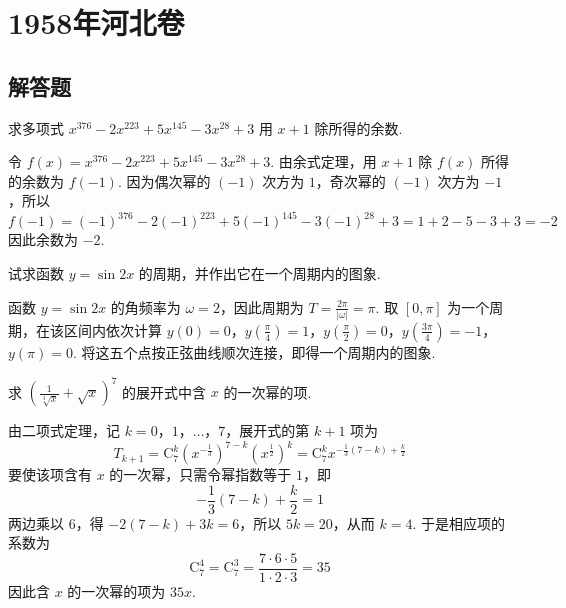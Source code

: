\chapter{1958年河北卷}

\section{解答题}

\begin{problem}
求多项式 \(x^{376}-2x^{223}+5x^{145}-3x^{28}+3\) 用 \(x+1\) 除所得的余数.
\end{problem}

\begin{solution}
令 \(f(x)=x^{376}-2x^{223}+5x^{145}-3x^{28}+3\). 由余式定理，用 \(x+1\) 除 \(f(x)\) 所得的余数为 \(f(-1)\). 因为偶次幂的 \((-1)\) 次方为 \(1\)，奇次幂的 \((-1)\) 次方为 \(-1\)，所以
\[
f(-1)=(-1)^{376}-2(-1)^{223}+5(-1)^{145}-3(-1)^{28}+3=1+2-5-3+3=-2
\]
因此余数为 \(-2\).
\end{solution}

\begin{problem}
试求函数 \(y=\sin 2x\) 的周期，并作出它在一个周期内的图象.
\end{problem}

\begin{solution}
函数 \(y=\sin 2x\) 的角频率为 \(\omega=2\)，因此周期为 \(T=\frac{2\pi}{\lvert\omega\rvert}=\pi\). 取 \([0,\pi]\) 为一个周期，在该区间内依次计算
\(y(0)=0\)，\(y\left(\frac{\pi}{4}\right)=1\)，\(y\left(\frac{\pi}{2}\right)=0\)，\(y\left(\frac{3\pi}{4}\right)=-1\)，\(y(\pi)=0\). 将这五个点按正弦曲线顺次连接，即得一个周期内的图象.

\end{solution}

\begin{problem}
求 \(\left( \frac{1}{\sqrt[3]{x}}+\sqrt{x} \right)^{7}\) 的展开式中含 \(x\) 的一次幂的项.
\end{problem}

\begin{solution}
由二项式定理，记 \(k=0\)，\(1\)，\(\ldots\)，\(7\)，展开式的第 \(k+1\) 项为
\[
T_{k+1}=\mathrm C_7^k\left(x^{-\frac{1}{3}}\right)^{7-k}\left(x^{\frac{1}{2}}\right)^k=\mathrm C_7^k x^{-\frac{1}{3}(7-k)+\frac{k}{2}}
\]
要使该项含有 \(x\) 的一次幂，只需令幂指数等于 \(1\)，即
\[
-\frac{1}{3}(7-k)+\frac{k}{2}=1
\]
两边乘以 \(6\)，得 \(-2(7-k)+3k=6\)，所以 \(5k=20\)，从而 \(k=4\). 于是相应项的系数为
\[
\mathrm C_7^4=\mathrm C_7^3=\frac{7\cdot6\cdot5}{1\cdot2\cdot3}=35
\]
因此含 \(x\) 的一次幂的项为 \(35x\).
\end{solution}


